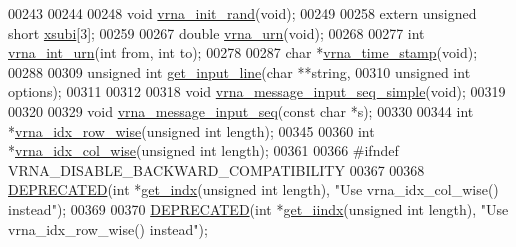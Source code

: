 \begin{DoxyCode}
00243 
00244 
00248 \textcolor{keywordtype}{void} \mbox{\hyperlink{group__utils_ga0ad1f40ea316e5c5918695c35613027a}{vrna\_init\_rand}}(\textcolor{keywordtype}{void});
00249 
00258 \textcolor{keyword}{extern} \textcolor{keywordtype}{unsigned} \textcolor{keywordtype}{short} \mbox{\hyperlink{group__utils_gaf9a866c8417afda7368bbac939ab3c47}{xsubi}}[3];
00259 
00267 \textcolor{keywordtype}{double} \mbox{\hyperlink{group__utils_ga384e256ebb295d04a14426179db0dd6e}{vrna\_urn}}(\textcolor{keywordtype}{void});
00268 
00277 \textcolor{keywordtype}{int} \mbox{\hyperlink{group__utils_ga46111bb3747dbcf4609f0d40ae169ad9}{vrna\_int\_urn}}(\textcolor{keywordtype}{int} from, \textcolor{keywordtype}{int} to);
00278 
00287 \textcolor{keywordtype}{char}  *\mbox{\hyperlink{group__utils_gad3bbe8d01afb1310609cb018d5290550}{vrna\_time\_stamp}}(\textcolor{keywordtype}{void});
00288 
00309 \textcolor{keywordtype}{unsigned} \textcolor{keywordtype}{int} \mbox{\hyperlink{group__utils_ga8ef1835eb83f542396f59f0b205965e5}{get\_input\_line}}(\textcolor{keywordtype}{char} **\textcolor{keywordtype}{string},
00310                             \textcolor{keywordtype}{unsigned} \textcolor{keywordtype}{int} options);
00311 
00312 
00318 \textcolor{keywordtype}{void} \mbox{\hyperlink{group__utils_gaee1dd652ca5b9e56b096963a1576f73b}{vrna\_message\_input\_seq\_simple}}(\textcolor{keywordtype}{void});
00319 
00320 
00329 \textcolor{keywordtype}{void} \mbox{\hyperlink{group__utils_gaf4d194d558b0c975f269de01dea52460}{vrna\_message\_input\_seq}}(\textcolor{keyword}{const} \textcolor{keywordtype}{char} *s);
00330 
00344 \textcolor{keywordtype}{int} *\mbox{\hyperlink{group__utils_ga70b180e9ea764218a82647a1cd347445}{vrna\_idx\_row\_wise}}(\textcolor{keywordtype}{unsigned} \textcolor{keywordtype}{int} length);
00345 
00360 \textcolor{keywordtype}{int} *\mbox{\hyperlink{group__utils_ga89ebc69c52fa0c78c9e1974b0017746b}{vrna\_idx\_col\_wise}}(\textcolor{keywordtype}{unsigned} \textcolor{keywordtype}{int} length);
00361 
00366 \textcolor{preprocessor}{#ifndef VRNA\_DISABLE\_BACKWARD\_COMPATIBILITY}
00367 
00368 \mbox{\hyperlink{utils_8h_aab347a3c03fbe8e7319551b9fa0cce4a}{DEPRECATED}}(\textcolor{keywordtype}{int}   *\mbox{\hyperlink{utils_8h_a4d9ee1572c1bfcd02d3d3f2db8a6530f}{get\_indx}}(\textcolor{keywordtype}{unsigned} \textcolor{keywordtype}{int} length), \textcolor{stringliteral}{"Use vrna\_idx\_col\_wise() instead"});
00369 
00370 \mbox{\hyperlink{utils_8h_aab347a3c03fbe8e7319551b9fa0cce4a}{DEPRECATED}}(\textcolor{keywordtype}{int}   *\mbox{\hyperlink{utils_8h_a55c0f6b3b07b6adf2ee235ba901fe397}{get\_iindx}}(\textcolor{keywordtype}{unsigned} \textcolor{keywordtype}{int} length), \textcolor{stringliteral}{"Use vrna\_idx\_row\_wise() instead"});

\end{DoxyCode}

